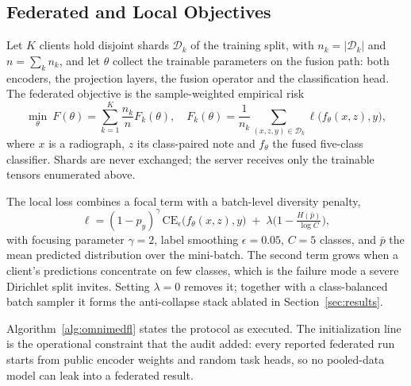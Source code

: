 \documentclass[letterpaper, conference]{IEEEtran}
\begin{document}
\subsection{Federated and Local Objectives}
\label{sec:objective}
Let $K$ clients hold disjoint shards $\mathcal{D}_k$ of the training split, with
$n_k=|\mathcal{D}_k|$ and $n=\sum_k n_k$, and let $\theta$ collect the trainable
parameters on the fusion path: both encoders, the projection layers, the fusion
operator and the classification head. The federated objective is the
sample-weighted empirical risk
\begin{equation}
\min_{\theta}\ F(\theta)=\sum_{k=1}^{K}\frac{n_k}{n}F_k(\theta),\quad
F_k(\theta)=\frac{1}{n_k}\!\!\sum_{(x,z,y)\in\mathcal{D}_k}\!\!\ell\big(f_\theta(x,z),y\big),
\label{eq:fedobj}
\end{equation}
where $x$ is a radiograph, $z$ its class-paired note and $f_\theta$ the fused
five-class classifier. Shards are never exchanged; the server receives only the
trainable tensors enumerated above.

The local loss combines a focal term with a batch-level diversity penalty,
\begin{equation}
\ell=(1-p_y)^{\gamma}\,\mathrm{CE}_{\epsilon}\big(f_\theta(x,z),y\big)
\;+\;\lambda\Big(1-\tfrac{H(\bar{p})}{\log C}\Big),
\label{eq:loss}
\end{equation}
with focusing parameter $\gamma{=}2$, label smoothing $\epsilon{=}0.05$,
$C{=}5$ classes, and $\bar{p}$ the mean predicted distribution over the
mini-batch. The second term grows when a client's predictions concentrate on few
classes, which is the failure mode a severe Dirichlet split invites. Setting
$\lambda{=}0$ removes it; together with a class-balanced batch sampler it forms
the anti-collapse stack ablated in Section~\ref{sec:results}.

Algorithm~\ref{alg:omnimedfl} states the protocol as executed. The
initialization line is the operational constraint that the audit added: every
reported federated run starts from public encoder weights and random task heads,
so no pooled-data model can leak into a federated result.
\end{document}
